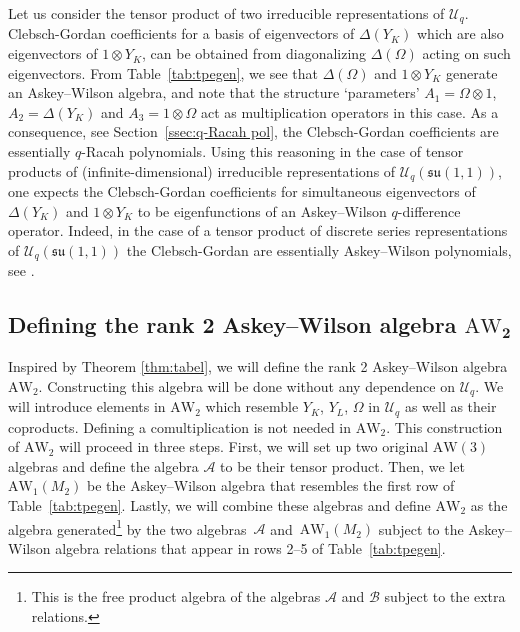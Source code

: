 \documentclass[pdftex]{sigma}
\numberwithin{equation}{section}
\newcommand{\aw}{\mathrm{AW}\!\left(3\right)}
\newcommand{\awc}[2]{\mathrm{AW}_{#1}\!\left(#2\right)}
\newcommand{\AW}[1]{\mathrm{AW}_{#1}}
\newcommand{\bivariateawalgebra}{rank 2 Askey--Wilson algebra }
\newcommand{\Uq}{\mathcal{U}_q}
\begin{document}
\begin{Remark}
	Let us consider the tensor product of two irreducible representations of $\mathcal U_q$. Clebsch-Gordan coefficients for a basis of eigenvectors of $\Delta(Y_K)$ which are also eigenvectors of $1 \otimes Y_K$, can be obtained from diagonalizing $\Delta(\Omega)$ acting on such eigenvectors. From Table~\ref{tab:tpegen}, we see that $\Delta(\Omega)$ and $1 \otimes Y_K$ generate an Askey--Wilson algebra, and note that the structure `parameters' $A_1=\Omega\otimes 1$, $A_2=\Delta(Y_K)$ and $A_3=1\otimes \Omega$ act as multiplication operators in this case. As a consequence, see Section~\ref{ssec:q-Racah pol}, the Clebsch-Gordan coefficients are essentially $q$-Racah polynomials. Using this reasoning in the case of tensor products of (infinite-dimensional) irreducible representations of $\mathcal U_q(\mathfrak{su}(1,1))$, one expects the Clebsch-Gordan coefficients for simultaneous eigenvectors of $\Delta(Y_K)$ and $1\otimes Y_K$ to be eigenfunctions of an Askey--Wilson $q$-difference operator. Indeed, in the case of a tensor product of discrete series representations of $\mathcal U_q(\mathfrak{su}(1,1))$ the Clebsch-Gordan are essentially Askey--Wilson polynomials, see \cite{Groenevelt2004, KvdJ}.
\end{Remark}

\subsection[Defining the rank 2 Askey-Wilson algebra AW\_2]{Defining the \bivariateawalgebra $\boldsymbol{\AW{2}}$}

Inspired by Theorem \ref{thm:tabel}, we will define the \bivariateawalgebra $\AW{2}$. Constructing this algebra will be done without any dependence on $\Uq$. We will introduce elements in $\AW{2}$ which resemble $Y_K$, $Y_L$, $\Omega$ in $\Uq$ as well as their coproducts. Defining a comultiplication is not needed in $\AW{2}$. This construction of $\AW{2}$ will proceed in three steps. First, we will set up two original $\aw$ algebras and define the algebra $\mathscr{A}$ to be their tensor product. Then, we let $\awc{1}{M_2}$ be the Askey--Wilson algebra that resembles the first row of Table~\ref{tab:tpegen}. Lastly, we will combine these algebras and define $\AW{2}$ as the algebra generated\footnote{This is the free product algebra of the algebras $\mathscr{A}$ and $\mathscr{B}$ subject to the extra relations.} by the two algebras~$\mathscr{A}$ and~$\awc{1}{M_2}$ subject to the Askey--Wilson algebra relations that appear in rows 2--5 of Table~\ref{tab:tpegen}.
\end{document}
